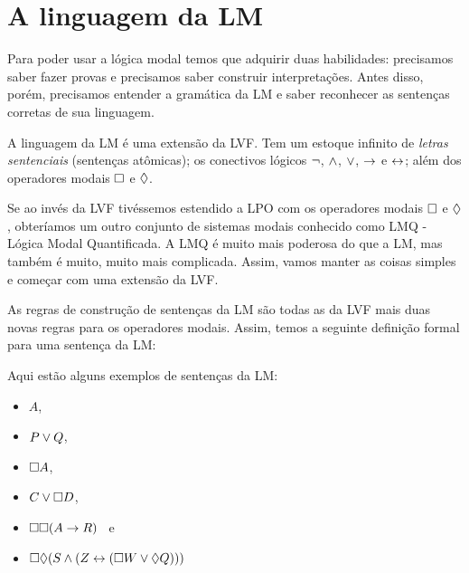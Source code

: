  

\section{A linguagem da LM}
\label{TFLtoML}

Para poder usar a lógica modal temos que adquirir duas habilidades: precisamos saber fazer provas e precisamos saber construir interpretações. Antes disso, porém, precisamos entender a gramática da LM e saber reconhecer as sentenças corretas de sua linguagem.

A linguagem da LM é uma extensão da LVF. Tem um estoque infinito de \emph{letras sentenciais} (sentenças atômicas); os conectivos lógicos $\neg$, $\wedge$,  $\vee$,    $\rightarrow$  e $\leftrightarrow$; além dos  operadores modais  $\Box$ e $\Diamond$.

Se ao invés da LVF tivéssemos estendido a LPO com os operadores modais  $\Box$ e $\Diamond$, obteríamos um outro conjunto de sistemas modais conhecido como LMQ - Lógica Modal Quantificada. A LMQ é muito mais poderosa do que a LM, mas também é muito, muito mais complicada. Assim,  vamos manter as coisas simples e começar com uma extensão da LVF. 

As regras de construção de  sentenças da LM são todas as da LVF mais duas novas regras para os operadores modais. Assim, temos a seguinte definição formal para uma sentença da LM:
 
Aqui estão alguns exemplos de sentenças  da LM:
\begin{itemize}
	 \item[]$A$,
\item[]$P\vee Q$,
\item[]$\Box A$,
\item[]$C\vee \Box D$,
\item[]$\Box\Box (A\rightarrow R)$  \,  e	
	\item[]$\Box\Diamond (S\wedge (Z\leftrightarrow (\Box W \vee \Diamond Q)))$
\end{itemize}    
   
